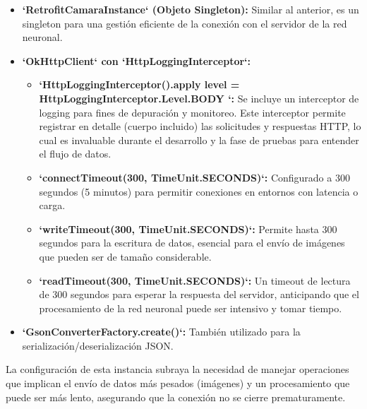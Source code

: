 \begin{itemize}
	\item \textbf{`RetrofitCamaraInstance` (Objeto Singleton):} Similar al anterior, es un singleton para una gestión eficiente de la conexión con el servidor de la red neuronal.
	\item \textbf{`OkHttpClient` con `HttpLoggingInterceptor`:}
	\begin{itemize}
		\item \textbf{`HttpLoggingInterceptor().apply { level = HttpLoggingInterceptor.Level.BODY }`:} Se incluye un interceptor de logging para fines de depuración y monitoreo. Este interceptor permite registrar en detalle (cuerpo incluido) las solicitudes y respuestas HTTP, lo cual es invaluable durante el desarrollo y la fase de pruebas para entender el flujo de datos.
		\item \textbf{`connectTimeout(300, TimeUnit.SECONDS)`:} Configurado a 300 segundos (5 minutos) para permitir conexiones en entornos con latencia o carga.
		\item \textbf{`writeTimeout(300, TimeUnit.SECONDS)`:} Permite hasta 300 segundos para la escritura de datos, esencial para el envío de imágenes que pueden ser de tamaño considerable.
		\item \textbf{`readTimeout(300, TimeUnit.SECONDS)`:} Un timeout de lectura de 300 segundos para esperar la respuesta del servidor, anticipando que el procesamiento de la red neuronal puede ser intensivo y tomar tiempo.
	\end{itemize}
	\item \textbf{`GsonConverterFactory.create()`:} También utilizado para la serialización/deserialización JSON.
\end{itemize}
La configuración de esta instancia subraya la necesidad de manejar operaciones que implican el envío de datos más pesados (imágenes) y un procesamiento que puede ser más lento, asegurando que la conexión no se cierre prematuramente.


